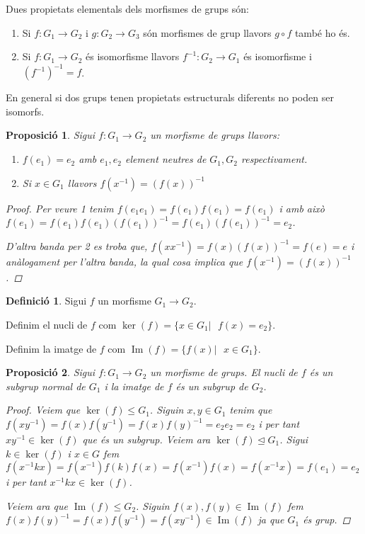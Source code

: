 \documentclass[a4paper,11pt]{report}
\newcommand{\inv}[1]{#1^{-1}}
\theoremstyle{theorem}
\newtheorem{proposicio}{\normalfont \sffamily\bfseries Proposició}[section]
\theoremstyle{definition}
\newtheorem{definicio}{\normalfont\sffamily\bfseries Definició}[section]
\DeclareMathOperator{\ima}{Im}
\begin{document}
Dues propietats elementals dels morfismes de grups són:
\begin{enumerate}
	\item Si $f:G_1\longrightarrow G_2$ i $g:G_2\longrightarrow G_3$ són morfismes de grup llavors $g\circ f$ també ho és.
	\item Si $f:G_1\longrightarrow G_2$ és isomorfisme llavors $\inv{f}:G_2\longrightarrow G_1$ és isomorfisme i $\inv{(\inv{f})}=f$.
\end{enumerate}
En general si dos grups tenen propietats estructurals diferents no poden ser isomorfs.
\begin{proposicio}
	Sigui $f:G_1\longrightarrow G_2$ un morfisme de grups llavors:
	\begin{enumerate}
		\item $f(e_1)=e_2$ amb $e_1,e_2$ element neutres de $G_1,G_2$ respectivament.
		\item Si $x\in G_1$ llavors $f(\inv{x})=\inv{(f(x))}$	\end{enumerate}
	\begin{proof}
		Per veure 1 tenim $f(e_1e_1)=f(e_1)f(e_1)=f(e_1)$ i amb això $f(e_1)=f(e_1)f(e_1)\inv{(f(e_1))}=f(e_1)(f(e_1))^{-1}=e_2$.
		
		D'altra banda per 2 es troba que, $f(x\inv{x})=f(x)\inv{(f(x))}=f(e)=e$ i anàlogament per l'altra banda, la qual cosa implica que $f(\inv{x})=(f(x))^{-1}$.
	\end{proof}
\end{proposicio}
\begin{definicio}
	Sigui $f$ un morfisme $G_1\longrightarrow G_2$.
	
	Definim el nucli de $f$ com $\ker(f)=\{x\in G_1|\text{ }f(x)=e_{2}\}$.
	
	Definim la imatge de $f$ com $\ima(f)=\{f(x)|\text{ }x\in G_1\}$.
\end{definicio}
\begin{proposicio}Sigui $f:G_1\longrightarrow G_2$ un morfisme de grups.
El nucli de $f$ és un subgrup normal de $G_1$ i la imatge de $f$ és un subgrup de $G_2$.
\begin{proof}
	Veiem que $\ker(f)\leq G_1$. Siguin $x,y\in G_1$ tenim que $f(x\inv{y})=f(x)f(\inv{y})=f(x)\inv{f(y)}=e_{2}e_{2}=e_{2}$ i per tant $x\inv{y}\in\ker(f)$ que és un subgrup. Veiem ara $\ker(f)\unlhd G_1$. Sigui $k\in\ker(f)$ i $x\in G$ fem $f(\inv{x}kx)=f(\inv{x})f(k)f(x)=f(\inv{x})f(x)=f(\inv{x}x)=f(e_{1})=e_2$ i per tant $\inv{x}kx\in\ker(f)$.
	
	Veiem ara que $\ima(f)\leq G_2$. Siguin $f(x),f(y)\in\ima(f)$ fem $f(x)\inv{f(y)}=f(x)f(\inv{y})=f(x\inv{y})\in\ima(f)$ ja que $G_1$ és grup. 
\end{proof}
\end{proposicio}
\end{document}
